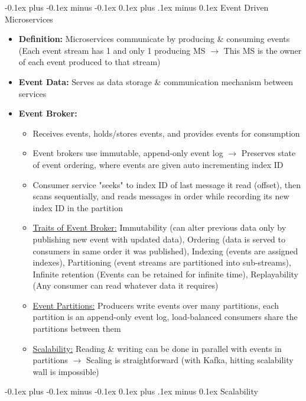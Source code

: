 \documentclass[landscape]{article}
\makeatletter
\renewcommand{\section}{\@startsection{section}{1}{0mm}%
  {-0.1ex plus -0.1ex minus -0.1ex}%
  {0.1ex plus .1ex minus 0.1ex}%
{\normalfont\small\bfseries}}
\renewcommand{\subsection}{\@startsection{subsection}{2}{0mm}%
  {-0.1ex plus -0.1ex minus -0.1ex}%
  {0.1ex plus .1ex minus 0.1ex}%
{\normalfont\scriptsize\bfseries}}
\makeatother
\begin{document}
\begin{multicols*}{5}
    \subsection{Event Driven Microservices}
    \begin{itemize}
      \item \textbf{Definition:} Microservices communicate by producing \& consuming events (Each event stream has 1 and only 1 producing MS $\rightarrow$ This MS is the owner of each event produced to that stream)
      \item \textbf{Event Data:} Serves as data storage \& communication mechanism between services
      \item \textbf{Event Broker:} 
      \begin{itemize}
        \item Receives events, holds/stores events, and provides events for consumption
        \item Event brokers use immutable, append-only event log $\rightarrow$ Preserves state of event ordering, where events are given auto incrementing index ID
        \item Consumer service "seeks" to index ID of last message it read (offset), then scans sequentially, and reads messages in order while recording its new index ID in the partition
        \item \underline{Traits of Event Broker:} Immutability (can alter previous data only by publishing new event with updated data), Ordering (data is served to consumers in same order it was published), Indexing (events are assigned indexes), Partitioning (event streams are partitioned into sub-streams), Infinite retention (Events can be retained for infinite time), Replayability (Any consumer can read whatever data it requires)
        \item \underline{Event Partitions:} Producers write events over many partitions, each partition is an append-only event log, load-balanced consumers share the partitions between them
        \item \underline{Scalability:} Reading \& writing can be done in parallel with events in partitions $\rightarrow$ Scaling is straightforward (with Kafka, hitting scalability wall is impossible)
      \end{itemize}
    \end{itemize}

    \section{Scalability}

\end{multicols*}
\end{document}
